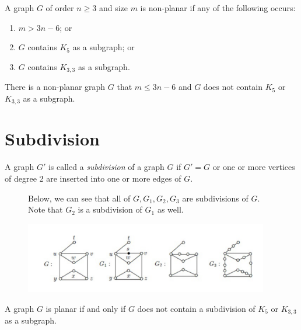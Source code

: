 \begin{theorem}
  A graph \(G\) of order \(n \geq 3\) and size \(m\) is
  non-planar if any of the following occurs:
  \begin{enumerate}[label=(\arabic*.)]
    \item \(m > 3n-6\); or
    \item \(G\) contains \(K_5\) as a subgraph; or
    \item \(G\) contains \(K_{3, 3}\) as a subgraph.
  \end{enumerate}
\end{theorem}

\begin{remark}
  There is a non-planar graph \(G\) that \(m \leq 3n - 6\) and
  \(G\) does not contain \(K_5\) or \(K_{3, 3}\) as a subgraph.
\end{remark}

\section{Subdivision}

\begin{definition}[Subdivision]
  A graph \(G'\) is called a \textit{subdivision} of a graph
  \(G\) if \(G' = G\) or one or more vertices of degree 2 are
  inserted into one or more edges of \(G\).
\end{definition}

\begin{figure}[ht]
\begin{nexample}
  Below, we can see that all of \(G, G_1, G_2, G_3\) are
  subdivisions of \(G\). Note that \(G_2\) is a subdivision of
  \(G_1\) as well.

  \centering
  \includegraphics[width=0.95\textwidth]{figures/l13/subdiv-example}
\end{nexample}
\end{figure}

\begin{theorem}
  A graph \(G\) is planar if and only if \(G\) does not contain a
  subdivision of \(K_5\) or \(K_{3, 3}\) as a subgraph.
\end{theorem}


